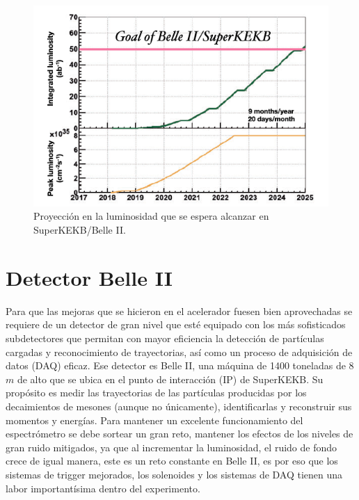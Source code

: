 \begin{figure}[h]
    \centering
    \includegraphics[scale=.5]{Images/Lumgoal.png}
    \caption{\small Proyección en la luminosidad que se espera alcanzar en SuperKEKB/Belle II.}
    \label{fig:superkekb}
\end{figure}

\section{Detector Belle II}

Para que las mejoras que se hicieron en el acelerador fuesen bien aprovechadas se requiere de un detector de gran nivel que esté equipado con los más sofisticados subdetectores que permitan con mayor eficiencia la detección de partículas cargadas y reconocimiento de trayectorias, así como un proceso de adquisición de datos (DAQ) eficaz. Ese detector es Belle II, una máquina de 1400 toneladas de 8 \(m\) de alto que se ubica en el punto de interacción (IP) de SuperKEKB. Su propósito es medir las trayectorias de las partículas producidas por los decaimientos de mesones (aunque no únicamente), identificarlas y reconstruir sus momentos y energías. Para mantener un excelente funcionamiento del espectrómetro se debe sortear un gran reto, mantener los efectos de los niveles de gran ruido mitigados, ya que al incrementar la luminosidad, el ruido de fondo crece de igual manera, este es un reto constante en Belle II, es por eso que los sistemas de trigger mejorados, los solenoides y  los sistemas de DAQ tienen una labor importantísima dentro del experimento. 

